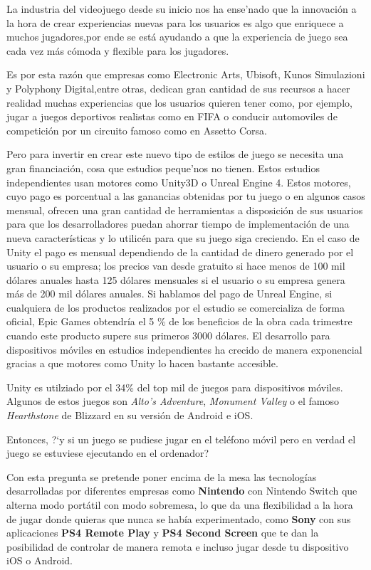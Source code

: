 La industria del videojuego desde su inicio nos ha ense'nado que la innovaci\'on
 a la hora de crear experiencias nuevas para los usuarios es algo que enriquece a muchos jugadores,por ende se est\'a ayudando a que
la experiencia de juego sea cada vez m\'as c\'omoda y flexible para los jugadores.

Es por esta raz\'on que empresas como Electronic Arts, Ubisoft, Kunos Simulazioni y Polyphony Digital,entre otras, dedican gran cantidad de sus recursos
a hacer realidad muchas experiencias que los usuarios quieren tener como, por ejemplo,
 jugar a juegos deportivos realistas como en FIFA o conducir automoviles de competici\'on por un circuito famoso como en Assetto Corsa.

Pero para invertir en crear este nuevo tipo de estilos de juego se necesita una gran financiaci\'on,
 cosa que estudios peque'nos no tienen.  Estos estudios independientes usan motores como Unity3D o Unreal Engine 4.
 Estos motores, cuyo pago es porcentual a las ganancias obtenidas por tu juego o en algunos casos mensual, ofrecen una gran cantidad de herramientas a disposici\'on 
de sus usuarios para que los desarrolladores puedan ahorrar tiempo de implementaci\'on de una nueva caracter\'isticas y lo utilic\'en para que su juego siga creciendo.
En el caso de Unity el pago es mensual dependiendo de la cantidad de dinero generado por el usuario o su empresa;
 los precios van desde gratuito si hace menos de 100 mil d\'olares anuales hasta 125 d\'olares mensuales si el usuario o su empresa genera m\'as de 200 mil d\'olares
  anuales. 
  Si hablamos del pago de Unreal Engine, si cualquiera de los productos realizados por el estudio se comercializa de forma oficial, Epic Games obtendr\'ia el 5 \% de los beneficios de la obra cada trimestre cuando este producto supere sus primeros 3000 d\'olares.
El desarrollo para dispositivos m\'oviles en estudios independientes ha crecido de manera exponencial gracias a que motores como Unity lo hacen bastante accesible. 

Unity es utilziado por el 34\% del top mil de juegos para dispositivos m\'oviles. Algunos de estos juegos son \textit{Alto's Adventure}, \textit{Monument Valley} o el famoso \textit{Hearthstone} de Blizzard en su versi\'on de Android e iOS.

Entonces,
 ?`y si un juego se pudiese jugar en el tel\'efono m\'ovil pero en verdad el juego se estuviese ejecutando en el ordenador?

Con esta pregunta se pretende poner encima de la mesa las tecnolog\'ias desarrolladas por diferentes empresas como \textbf{Nintendo} con Nintendo Switch que alterna modo port\'atil con modo sobremesa, lo que da una flexibilidad a la hora de jugar donde quieras que nunca se hab\'ia experimentado, 
como \textbf{Sony} con sus aplicaciones \textbf{PS4 Remote Play} y \textbf{PS4 Second Screen} que te dan la posibilidad de controlar de manera remota e incluso jugar desde tu dispositivo iOS o Android.

